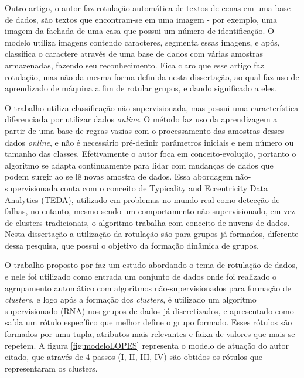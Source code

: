 Outro artigo, o autor \cite{Iwamura2013} faz rotulação automática de textos de cenas em uma base de dados, são textos que encontram-se em uma imagem - por exemplo, uma imagem da fachada de uma casa que possui um número de identificação. O modelo utiliza imagens contendo caracteres, segmenta essas imagens, e após, classifica o caractere através de uma base de dados com várias amostras armazenadas, fazendo seu reconhecimento. Fica claro que esse artigo faz rotulação, mas não da mesma forma definida nesta dissertação, ao qual faz uso de aprendizado de máquina a fim de rotular grupos, e dando significado a eles.


O trabalho \cite{Costa2016} utiliza classificação não-supervisionada, mas possui uma característica diferenciada por utilizar dados \textit{online}. O método faz uso da aprendizagem a partir de uma base de regras vazias com o processamento das amostras desses dados \textit{online}, e não é necessário pré-definir parâmetros iniciais e nem número ou tamanho das classes. Efetivamente o autor foca em conceito-evolução, portanto o algoritmo se adapta continuamente para lidar com mudanças de dados que podem surgir ao se lê novas amostra de dados. Essa abordagem não-supervisionada conta com o conceito de Typicality and Eccentricity Data Analytics (TEDA), utilizado em problemas no mundo real como detecção de falhas, no entanto, mesmo sendo um comportamento não-supervisionado, em vez de clusters tradicionais, o algoritmo trabalha com conceito de nuvens de dados. Nesta dissertação a utilização da rotulação são para grupos já formados, diferente dessa pesquisa,  que possui o objetivo da formação dinâmica de grupos.




O trabalho proposto por \cite{Lopes2016} faz um estudo abordando o tema de rotulação de dados, e nele foi utilizado como entrada um conjunto de dados onde foi realizado o agrupamento automático com algoritmos não-supervisionados para  formação de  \textit{clusters}, e logo após a formação dos \textit{clusters}, é utilizado um algoritmo supervisionado (RNA) nos grupos de dados já discretizados, e apresentado como saída um rótulo específico que melhor define o grupo formado. Esses rótulos são formados por uma tupla, atributos mais relevantes e faixa de valores que mais se repetem. A figura \ref{fig:modeloLOPES} representa o modelo de atuação do autor citado, que através de 4 passos (I, II, III, IV) são obtidos os rótulos que representaram os clusters.

